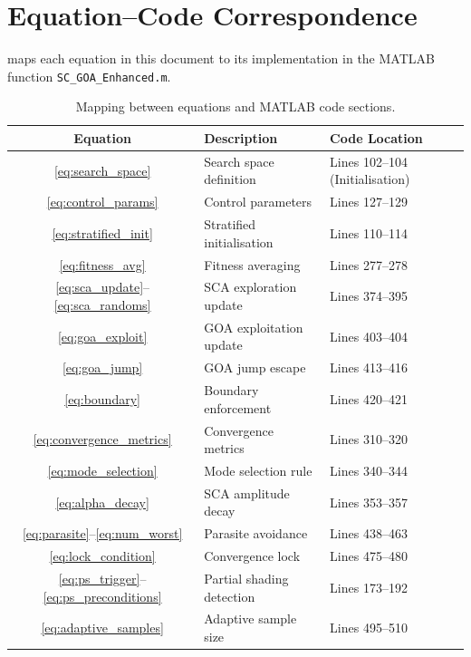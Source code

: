 \documentclass[a4paper, 12pt]{article}
\begin{document}
\section{Equation--Code Correspondence}
\label{sec:correspondence}

 maps each equation in this document to its implementation in the MATLAB function \texttt{SC\_GOA\_Enhanced.m}.

\begin{table}[htbp]
\centering
\caption{Mapping between equations and MATLAB code sections.}
\label{tab:eq_code}
\renewcommand{\arraystretch}{1.3}
\begin{tabular}{@{} c l l @{}}
\toprule
\textbf{Equation} & \textbf{Description} & \textbf{Code Location} \\
\midrule
\cref{eq:search_space} & Search space definition & Lines 102--104 (Initialisation) \\
\cref{eq:control_params} & Control parameters & Lines 127--129 \\
\cref{eq:stratified_init} & Stratified initialisation & Lines 110--114 \\
\cref{eq:fitness_avg} & Fitness averaging & Lines 277--278 \\
\cref{eq:sca_update}--\cref{eq:sca_randoms} & SCA exploration update & Lines 374--395 \\
\cref{eq:goa_exploit} & GOA exploitation update & Lines 403--404 \\
\cref{eq:goa_jump} & GOA jump escape & Lines 413--416 \\
\cref{eq:boundary} & Boundary enforcement & Lines 420--421 \\
\cref{eq:convergence_metrics} & Convergence metrics & Lines 310--320 \\
\cref{eq:mode_selection} & Mode selection rule & Lines 340--344 \\
\cref{eq:alpha_decay} & SCA amplitude decay & Lines 353--357 \\
\cref{eq:parasite}--\cref{eq:num_worst} & Parasite avoidance & Lines 438--463 \\
\cref{eq:lock_condition} & Convergence lock & Lines 475--480 \\
\cref{eq:ps_trigger}--\cref{eq:ps_preconditions} & Partial shading detection & Lines 173--192 \\
\cref{eq:adaptive_samples} & Adaptive sample size & Lines 495--510 \\
\bottomrule
\end{tabular}
\end{table}
\end{document}
